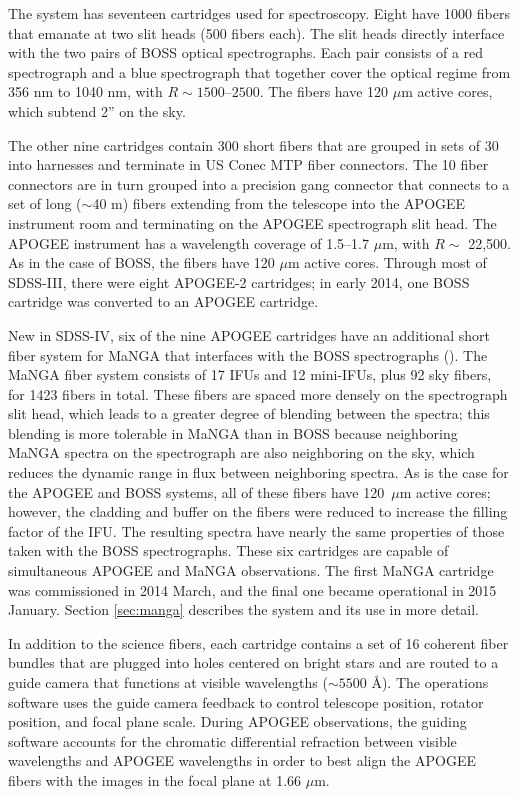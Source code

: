 The system has seventeen cartridges used for spectroscopy. Eight have
1000 fibers that emanate at two slit heads (500 fibers each). The slit
heads directly interface with the two pairs of BOSS optical
spectrographs. Each pair consists of a red spectrograph and a blue
spectrograph that together cover the optical regime from 356 nm to
1040 nm, with $R\sim 1500$--$2500$. The fibers have 120 $\mu$m active
cores, which subtend 2'' on the sky.

The other nine cartridges contain 300 short fibers that are grouped in
sets of 30 into harnesses and terminate in US Conec MTP fiber
connectors.  The 10 fiber connectors are in turn grouped into a
precision gang connector that connects to a set of long ($\sim$40 m)
fibers extending from the telescope into the APOGEE instrument room
and terminating on the APOGEE spectrograph slit head. The APOGEE
instrument has a wavelength coverage of 1.5--1.7 $\mu$m, with $R\sim$
22,500. As in the case of BOSS, the fibers have 120 $\mu$m active
cores.  Through most of SDSS-III, there were eight APOGEE-2
cartridges; in early 2014, one BOSS cartridge was converted to an
APOGEE cartridge.

New in SDSS-IV, six of the nine APOGEE cartridges have an additional
short fiber system for MaNGA that interfaces with the BOSS
spectrographs (\citealt{drory15a}). The MaNGA fiber system consists of
17 IFUs and 12 mini-IFUs, plus 92 sky fibers, for 1423 fibers in
total. These fibers are spaced more densely on the spectrograph slit
head, which leads to a greater degree of blending between the spectra;
this blending is more tolerable in MaNGA than in BOSS because
neighboring MaNGA spectra on the spectrograph are also neighboring on
the sky, which reduces the dynamic range in flux between neighboring
spectra. As is the case for the APOGEE and BOSS systems, all of these
fibers have \mbox{120 $\mu$m} active cores; however, the cladding and
buffer on the fibers were reduced to increase the filling factor of
the IFU.  The resulting spectra have nearly the same properties of
those taken with the BOSS spectrographs. These six cartridges are
capable of simultaneous APOGEE and MaNGA observations. The first MaNGA
cartridge was commissioned in 2014 March, and the final one became
operational in 2015 January. Section \ref{sec:manga} describes the
system and its use in more detail.

In addition to the science fibers, each cartridge contains a set of 16
coherent fiber bundles that are plugged into holes centered on bright
stars and are routed to a guide camera that functions at visible
wavelengths ($\sim 5500$ \AA). The operations software uses the guide
camera feedback to control telescope position, rotator position, and
focal plane scale. During APOGEE observations, the guiding software
accounts for the chromatic differential refraction between visible
wavelengths and APOGEE wavelengths in order to best align the APOGEE
fibers with the images in the focal plane at 1.66 $\mu$m.

